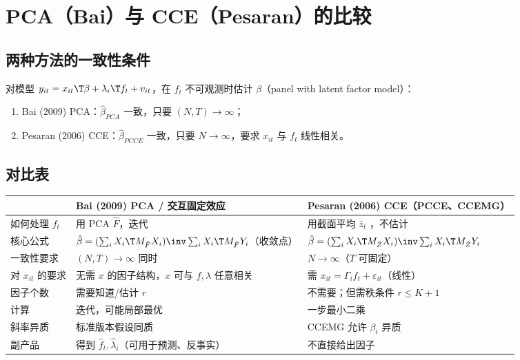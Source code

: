 \section{PCA（Bai）与 CCE（Pesaran）的比较}\label{sec:U14a-compare}

\subsection{两种方法的一致性条件}

对模型 $y_{it}=x_{it}\T\beta+\lambda_i\T f_t+v_{it}$，在 $f_t$ 不可观测时估计 $\beta$（panel with latent factor model）：
\begin{enumerate}[label=\arabic*.]
  \item Bai (2009) PCA：$\hat\beta_{PCA}$ 一致，只要 $(N,T)\to\infty$；
  \item Pesaran (2006) CCE：$\hat\beta_{PCCE}$ 一致，只要 $N\to\infty$，要求 $x_{it}$ 与 $f_t$ 线性相关。
\end{enumerate}

\subsection{对比表}

\begin{center}
\small
\begin{tabularx}{\linewidth}{lLL}
\toprule
 & Bai (2009) PCA / 交互固定效应 & Pesaran (2006) CCE（PCCE、CCEMG）\\
\midrule
如何处理 $f_t$ & 用 PCA  $\hat F$，迭代 & 用截面平均 $\bar z_t$ ，不估计\\
核心公式 & $\hat\beta=(\sum_iX_i\T M_{\hat F}X_i)\inv\sum_iX_i\T M_{\hat F}Y_i$（收敛点） & $\hat\beta=(\sum_iX_i\T M_{\bar Z}X_i)\inv\sum_iX_i\T M_{\bar Z}Y_i$\\
一致性要求 & $(N,T)\to\infty$ 同时 & $N\to\infty$（$T$ 可固定）\\
对 $x_{it}$ 的要求 & 无需 $x$ 的因子结构，$x$ 可与 $f,\lambda$ 任意相关 & 需 $x_{it}=\Gamma_if_t+\varepsilon_{it}$（线性）\\
因子个数 & 需要知道/估计 $r$ & 不需要；但需秩条件 $r\le K+1$\\
计算 & 迭代，可能局部最优 & 一步最小二乘\\
斜率异质 & 标准版本假设同质 & CCEMG 允许 $\beta_i$ 异质\\
副产品 & 得到 $\hat f_t,\hat\lambda_i$（可用于预测、反事实） & 不直接给出因子\\
\bottomrule
\end{tabularx}
\end{center}

